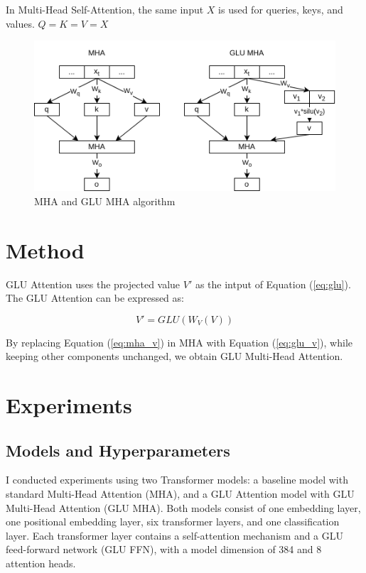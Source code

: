 \documentclass[11pt]{article}
\begin{document}
In Multi-Head Self-Attention, the same input $X$ is used for queries, keys, and values. $Q = K = V = X$

\begin{figure}[htbp]
    \centering
    
    \begin{minipage}{0.65\textwidth}
    \includegraphics[width=\textwidth]{GLU_Attention.png}
    \caption{MHA and GLU MHA algorithm}
    \end{minipage}
\end{figure}

\section{Method}
GLU Attention uses the projected value $V'$ as the intput of Equation (\ref{eq:glu}). The GLU Attention can be expressed as:

\begin{equation}
V' = GLU(W_V(V))
\label{eq:glu_v}
\end{equation}

By replacing Equation (\ref{eq:mha_v}) in MHA with Equation (\ref{eq:glu_v}), while keeping other components unchanged, we obtain GLU Multi-Head Attention.

\section{Experiments}

\subsection{Models and Hyperparameters}

I conducted experiments using two Transformer models: a baseline model with standard Multi-Head Attention (MHA), and a GLU Attention model with GLU Multi-Head Attention (GLU MHA). Both models consist of one embedding layer, one positional embedding layer, six transformer layers, and one classification layer. Each transformer layer contains a self-attention mechanism and a GLU feed-forward network (GLU FFN), with a model dimension of 384 and 8 attention heads.
\end{document}

